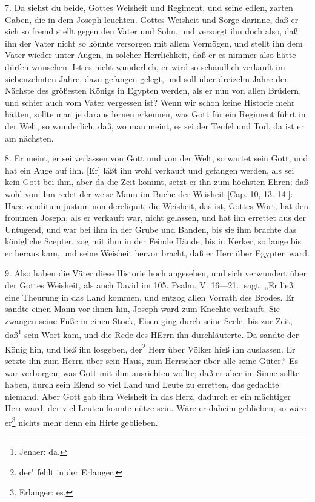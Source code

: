 7. Da siehst du beide, Gottes Weisheit und Regiment, und seine edlen, zarten Gaben, die in dem Joseph leuchten. Gottes Weisheit und Sorge darinne, daß er sich so fremd stellt gegen den Vater und Sohn, und versorgt ihn doch also, daß ihn der Vater nicht so könnte versorgen mit allem Vermögen, und stellt ihn dem Vater wieder unter Augen, in solcher Herrlichkeit, daß er es nimmer also hätte dürfen wünschen. Ist es nicht wunderlich, er wird so schändlich verkauft im siebenzehnten Jahre, dazu gefangen gelegt, und soll über dreizehn Jahre der Nächste des größesten Königs in Egypten werden, als er nun von allen Brüdern, und schier auch vom Vater vergessen ist? Wenn wir schon keine Historie mehr hätten, sollte man je daraus lernen erkennen, was Gott für ein Regiment führt in der Welt, so wunderlich, daß, wo man meint, es sei der Teufel und Tod, da ist er am nächsten.

8. Er meint, er sei verlassen von Gott und von der Welt, so wartet sein Gott, und hat ein Auge auf ihn. [Er] läßt ihn wohl verkauft und gefangen werden, als sei kein Gott bei ihm, aber da die Zeit kommt, setzt er ihn zum höchsten Ehren; daß wohl von ihm redet der weise Mann im Buche der Weisheit [Cap. 10, 13. 14.]: Haec venditum justum non dereliquit, die Weisheit, das ist, Gottes Wort, hat den frommen Joseph, als er verkauft war, nicht gelassen, und hat ihn errettet aus der Untugend, und war bei ihm in der Grube und Banden, bis sie ihm brachte das königliche Scepter, zog mit ihm in der Feinde Hände, bis in Kerker, so lange bis er heraus kam, und seine Weisheit hervor bracht, daß er Herr über Egypten ward.

9. Also haben die Väter diese Historie hoch angesehen, und sich verwundert über der Gottes Weisheit, als auch David im 105. Psalm, V. 16—21., sagt: „Er ließ eine Theurung in das Land kommen, und entzog allen Vorrath des Brodes. Er sandte einen Mann vor ihnen hin, Joseph ward zum Knechte verkauft. Sie zwangen seine Füße in einen Stock, Eisen ging durch seine Seele, bis zur Zeit, daß\footnote{Jenaer: da.} sein Wort kam, und die Rede des HErrn ihn durchläuterte. Da sandte der König hin, und ließ ihn losgeben, der\footnote{der" fehlt in der Erlanger.} Herr über Völker hieß ihn auslassen. Er setzte ihn zum Herrn über sein Haus, zum Herrscher über alle seine Güter.“ Es war verborgen, was Gott mit ihm ausrichten wollte; daß er aber im Sinne sollte haben, durch sein Elend so viel Land und Leute zu erretten, das gedachte niemand. Aber Gott gab ihm Weisheit in das Herz, dadurch er ein mächtiger Herr ward, der viel Leuten konnte nütze sein. Wäre er daheim geblieben, so wäre er\footnote{Erlanger: es.} nichts mehr denn ein Hirte geblieben.

